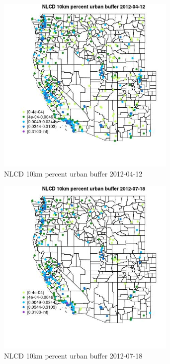 \begin{figure} 
\centering  
\includegraphics[width=0.77\textwidth]{Code_Outputs/Report_ML_input_PM25_Step4_part_e_de_duplicated_aves_compiled_2019-05-14wNAs_MapObsNLCD_10km_percent_urban_buffer2012-04-12.jpg} 
\caption{\label{fig:Report_ML_input_PM25_Step4_part_e_de_duplicated_aves_compiled_2019-05-14wNAsMapObsNLCD_10km_percent_urban_buffer2012-04-12}NLCD 10km percent urban buffer 2012-04-12} 
\end{figure} 
 

\begin{figure} 
\centering  
\includegraphics[width=0.77\textwidth]{Code_Outputs/Report_ML_input_PM25_Step4_part_e_de_duplicated_aves_compiled_2019-05-14wNAs_MapObsNLCD_10km_percent_urban_buffer2012-07-18.jpg} 
\caption{\label{fig:Report_ML_input_PM25_Step4_part_e_de_duplicated_aves_compiled_2019-05-14wNAsMapObsNLCD_10km_percent_urban_buffer2012-07-18}NLCD 10km percent urban buffer 2012-07-18} 
\end{figure} 
 
